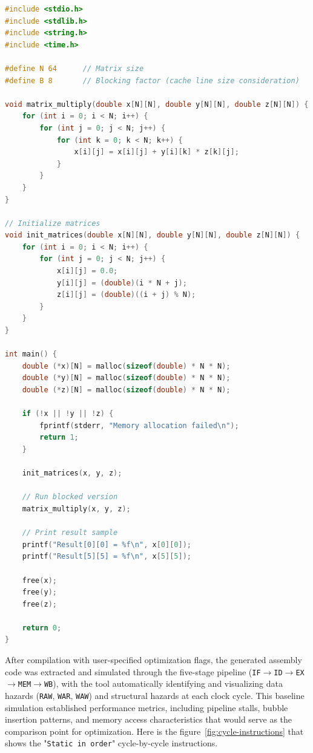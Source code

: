 \begin{lstlisting}[language=C, basicstyle=\ttfamily\scriptsize, tabsize=2]
#include <stdio.h>
#include <stdlib.h>
#include <string.h>
#include <time.h>

#define N 64      // Matrix size
#define B 8       // Blocking factor (cache line size consideration)

void matrix_multiply(double x[N][N], double y[N][N], double z[N][N]) {
    for (int i = 0; i < N; i++) {
        for (int j = 0; j < N; j++) {
            for (int k = 0; k < N; k++) {
                x[i][j] = x[i][j] + y[i][k] * z[k][j];
            }
        }
    }
}

// Initialize matrices
void init_matrices(double x[N][N], double y[N][N], double z[N][N]) {
    for (int i = 0; i < N; i++) {
        for (int j = 0; j < N; j++) {
            x[i][j] = 0.0;
            y[i][j] = (double)(i * N + j);
            z[i][j] = (double)((i + j) % N);
        }
    }
}

int main() {
    double (*x)[N] = malloc(sizeof(double) * N * N);
    double (*y)[N] = malloc(sizeof(double) * N * N);
    double (*z)[N] = malloc(sizeof(double) * N * N);
    
    if (!x || !y || !z) {
        fprintf(stderr, "Memory allocation failed\n");
        return 1;
    }

    init_matrices(x, y, z);
    
    // Run blocked version
    matrix_multiply(x, y, z);
    
    // Print result sample
    printf("Result[0][0] = %f\n", x[0][0]);
    printf("Result[5][5] = %f\n", x[5][5]);
    
    free(x);
    free(y);
    free(z);
    
    return 0;
}
\end{lstlisting}

After compilation with user-specified optimization flags, the generated assembly code was extracted and simulated through the five-stage pipeline (\texttt{IF}$\rightarrow$\texttt{ID}$\rightarrow$\texttt{EX}$\rightarrow$\texttt{MEM}$\rightarrow$\texttt{WB}), with the tool automatically identifying and visualizing data hazards (\texttt{RAW}, \texttt{WAR}, \texttt{WAW}) and structural hazards at each clock cycle. This baseline simulation established performance metrics, including pipeline stalls, bubble insertion patterns, and memory access characteristics that would serve as the comparison point for optimization. Here is the figure~\ref{fig:cycle-instructions} that shows the "\texttt{Static in order}" cycle-by-cycle instructions.

